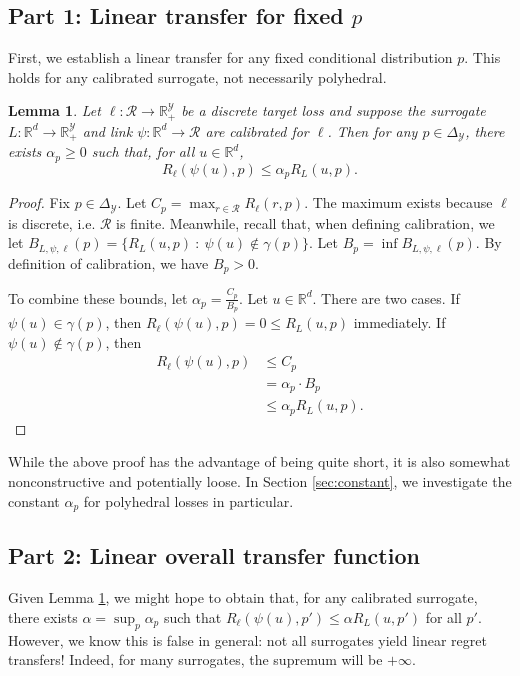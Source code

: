 \documentclass{article}
\newtheorem{lemma}{Lemma}
\theoremstyle{definition}\newtheorem{definition}{Definition}
\theoremstyle{definition}\newtheorem{assumption}{Assumption}
\newcommand{\reals}{\mathbb{R}}
\newcommand{\simplex}{\Delta_\Y}
\newcommand{\R}{\mathcal{R}}
\newcommand{\Y}{\mathcal{Y}}
\begin{document}
\subsection{Part 1: Linear transfer for fixed $p$}
First, we establish a linear transfer for any fixed conditional distribution $p$.
This holds for any calibrated surrogate, not necessarily polyhedral.
\begin{lemma} \label{lemma:fixed-p}
  Let $\ell: \R \to \reals_+^{\Y}$ be a discrete target loss and suppose the surrogate $L: \reals^d \to \reals_+^{\Y}$ and link $\psi: \reals^d \to \R$ are calibrated for $\ell$.
  Then for any $p \in \simplex$, there exists $\alpha_p \geq 0$ such that, for all $u \in \reals^d$,
    \[ R_{\ell}(\psi(u),p) \leq \alpha_p R_L(u,p) . \]
\end{lemma}
\begin{proof}
  Fix $p \in \simplex$.
  Let $C_p = \max_{r \in \R} R_{\ell}(r,p)$.
  The maximum exists because $\ell$ is discrete, i.e. $\R$ is finite.
  Meanwhile, recall that, when defining calibration, we let $B_{L,\psi,\ell}(p) = \{R_L(u,p) ~:~ \psi(u) \not\in \gamma(p)\}$.
  Let $B_p = \inf B_{L,\psi,\ell}(p)$.
  By definition of calibration, we have $B_p > 0$.

  To combine these bounds, let $\alpha_p = \frac{C_p}{B_p}$.
  Let $u \in \reals^d$.
  There are two cases.
  If $\psi(u) \in \gamma(p)$, then $R_{\ell}(\psi(u),p) = 0 \leq R_L(u,p)$ immediately.
  If $\psi(u) \not\in \gamma(p)$, then
  \begin{align*}
    R_{\ell}(\psi(u),p)
    &\leq C_p \\
    &=    \alpha_p \cdot B_p  \\
    &\leq \alpha_p R_L(u,p) .
  \end{align*}
\end{proof}
While the above proof has the advantage of being quite short, it is also somewhat nonconstructive and potentially loose.
In Section \ref{sec:constant}, we investigate the constant $\alpha_p$ for polyhedral losses in particular.

\subsection{Part 2: Linear overall transfer function}
Given Lemma \ref{lemma:fixed-p}, we might hope to obtain that, for any calibrated surrogate, there exists $\alpha = \sup_p \alpha_p$ such that $R_{\ell}(\psi(u),p') \leq \alpha R_L(u,p')$ for all $p'$.
However, we know this is false in general: not all surrogates yield linear regret transfers!
Indeed, for many surrogates, the supremum will be $+\infty$.
\end{document}
